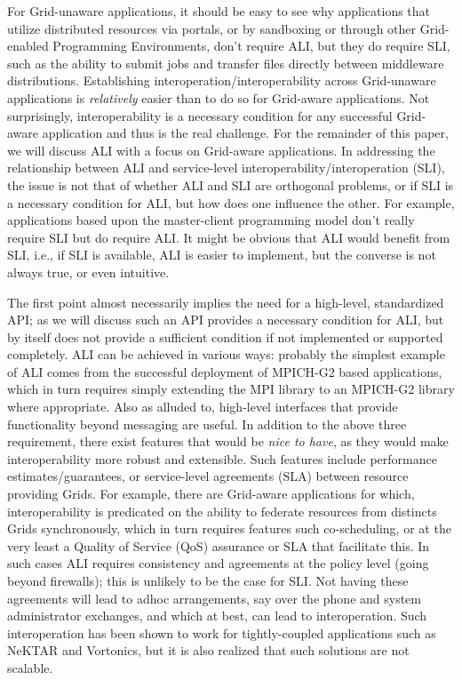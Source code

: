 \documentclass[conference,final]{IEEEtran}
\begin{document}
For Grid-unaware applications, it should be easy to see why
applications that utilize distributed resources via portals, or by
sandboxing or through other Grid-enabled Programming Environments,
don't require ALI, but they do require SLI, such as the ability to
submit jobs and transfer files directly between middleware
distributions. Establishing interoperation/interoperability across
Grid-unaware applications is {\it relatively} easier than to do so for
Grid-aware applications.  Not surprisingly, interoperability is a
necessary condition for any successful Grid-aware application and thus
is the real challenge.  For the remainder of this paper, we will
discuss ALI with a focus on Grid-aware applications.  In addressing
the relationship between ALI and service-level
interoperability/interoperation (SLI), the issue is not that of
whether ALI and SLI are orthogonal problems, or if SLI is a necessary
condition for ALI, but how does one influence the other.  For example,
applications based upon the master-client programming model don't
really require SLI but do require ALI.  It might be obvious that ALI
would benefit from SLI, i.e., if SLI is available, ALI is easier to
implement, but the converse is not always true, or even intuitive.


The first point almost necessarily implies the need for a high-level,
standardized API; as we will discuss such an API provides a necessary
condition for ALI, but by itself does not provide a sufficient
condition if not implemented or supported completely.  ALI can be
achieved in various ways: probably the simplest example of ALI comes
from the successful deployment of MPICH-G2 based applications, which
in turn requires simply extending the MPI library to an MPICH-G2
library where appropriate. Also as alluded to, high-level interfaces
that provide functionality beyond messaging are useful.  In addition
to the above three requirement, there exist features that would be
{\it nice to have}, as they would make interoperability more robust
and extensible. Such features include performance
estimates/guarantees, or service-level agreements (SLA) between
resource providing Grids.  For example, there are Grid-aware
applications for which, interoperability is predicated on the ability
to federate resources from distincts Grids synchronously, which in
turn requires features such co-scheduling, or at the very least a
Quality of Service (QoS) assurance or SLA that facilitate this.  In
such cases ALI requires consistency and agreements at the policy level
(going beyond firewalls); this is unlikely to be the case for SLI.
Not having these agreements will lead to adhoc arrangements, say over
the phone and system administrator exchanges, and which at best, can
lead to interoperation.  Such interoperation has been shown to work
for tightly-coupled applications such as NeKTAR and
Vortonics\cite{clade06}, but it is also realized that such solutions
are not scalable.
\end{document}

